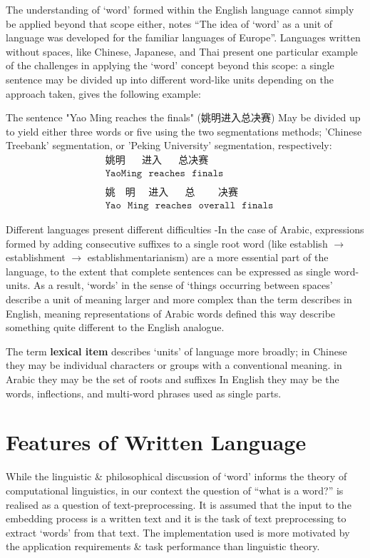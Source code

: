 The understanding of `word' formed within the English language cannot simply be applied beyond that scope either, \cite{dixon02-word} notes ``The idea of ‘word’ as a unit of language was developed for the familiar languages of Europe''. Languages written without spaces, like Chinese, Japanese, and Thai present one particular example of the challenges in applying the `word' concept beyond this scope: a single sentence may be divided up into different word-like units depending on the approach taken,\textcite{chen-2017-adversarial-multi} gives the following example:
\begin{example}
  The sentence "Yao Ming reaches the finals" (姚明进入总决赛) May be divided up to yield either three words or five using the two segmentations methods; 'Chinese Treebank' segmentation, or 'Peking University' segmentation, respectively:
  \begin{align*}
    &\texttt{姚明~~~~~进入~~~~~总决赛~}\\
    &\texttt{YaoMing~~reaches~~finals}\\
    \\
    &\texttt{姚~~~明~~~~进入~~~~~总~~~~~~~决赛}\\
    &\texttt{Yao~~Ming~~reaches~~overall~~finals}
  \end{align*}
\end{example}
Different languages present different difficulties -In the case of Arabic, expressions formed by adding consecutive suffixes to a single root word (like establish $\to$ establishment $\to$ establishmentarianism) are a more essential part of the language, to the extent that complete sentences can be expressed as single word-units. As a result, `words' in the sense of `things occurring between spaces' describe a unit of meaning larger and more complex than the term describes in English, meaning representations of Arabic words defined this way describe something quite different to the English analogue.

The term \textbf{lexical item} describes `units' of language more broadly; in Chinese they may be individual characters or groups with a conventional meaning. in Arabic they may be the set of roots and suffixes In English they may be the words, inflections, and multi-word phrases used as single parts.

\section{Features of Written Language}
While the linguistic \& philosophical discussion of `word' informs the theory of computational linguistics, in our context the question of ``what is a word?'' is realised as a question of text-preprocessing. It is assumed that the input to the embedding process is a written text and it is the task of text preprocessing to extract `words' from that text. The implementation used is more motivated by the application requirements \& task performance than linguistic theory.

